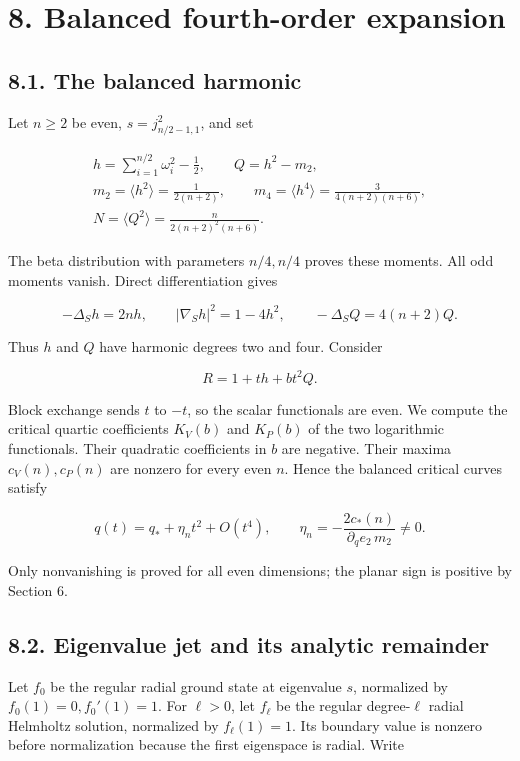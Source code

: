 \documentclass[11pt]{article}
\begin{document}
\section{8. Balanced fourth-order
expansion}\label{balanced-fourth-order-expansion}

\subsection{8.1. The balanced harmonic}\label{the-balanced-harmonic}

Let \(n\ge2\) be even, \(s=j_{n/2-1,1}^2\), and set

\[
\begin{gathered}
h=\sum_{i=1}^{n/2}\omega_i^2-\frac12,\qquad Q=h^2-m_2,\\
m_2=\langle h^2\rangle=\frac1{2(n+2)},\qquad
m_4=\langle h^4\rangle=\frac3{4(n+2)(n+6)},\\
N=\langle Q^2\rangle=\frac{n}{2(n+2)^2(n+6)}.
\end{gathered}
\tag{8.1}
\]

The beta distribution with parameters \(n/4,n/4\) proves these moments.
All odd moments vanish. Direct differentiation gives

\[
-\Delta_Sh=2nh,\qquad |\nabla_Sh|^2=1-4h^2,\qquad
-\Delta_SQ=4(n+2)Q.
\tag{8.2}
\]

Thus \(h\) and \(Q\) have harmonic degrees two and four. Consider

\[
R=1+th+bt^2Q.
\tag{8.3}
\]

Block exchange sends \(t\) to \(-t\), so the scalar functionals are
even. We compute the critical quartic coefficients \(K_V(b)\) and
\(K_P(b)\) of the two logarithmic functionals. Their quadratic
coefficients in \(b\) are negative. Their maxima \(c_V(n),c_P(n)\) are
nonzero for every even \(n\). Hence the balanced critical curves satisfy

\[
q(t)=q_*+\eta_nt^2+O(t^4),\qquad
\eta_n=-\frac{2c_*(n)}{\partial_qe_2\,m_2}\ne0.
\tag{8.4}
\]

Only nonvanishing is proved for all even dimensions; the planar sign is
positive by Section 6.

\subsection{8.2. Eigenvalue jet and its analytic
remainder}\label{eigenvalue-jet-and-its-analytic-remainder}

Let \(f_0\) be the regular radial ground state at eigenvalue \(s\),
normalized by \(f_0(1)=0,f_0'(1)=1\). For \(\ell>0\), let \(f_\ell\) be
the regular degree-\(\ell\) radial Helmholtz solution, normalized by
\(f_\ell(1)=1\). Its boundary value is nonzero before normalization
because the first eigenspace is radial. Write
\end{document}
